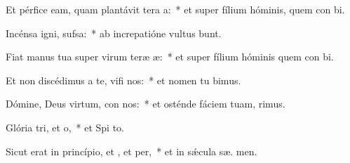\item Et pérfice eam, quam plantávit tera a:~* et super fílium hóminis, quem con bi.
\item Incénsa igni,  sufsa:~* ab increpatióne vultus  bunt.
\item Fiat manus tua super virum teræ æ:~* et super fílium hóminis quem con bi.
\item Et non discédimus a te, vifi nos:~* et nomen tu bimus.
\item Dómine, Deus virtum, con nos:~* et osténde fáciem tuam,   rimus.
\item Glória tri, et o,~* et Spi to.
\item Sicut erat in princípio, et , et per,~* et in sǽcula sæ. men.
